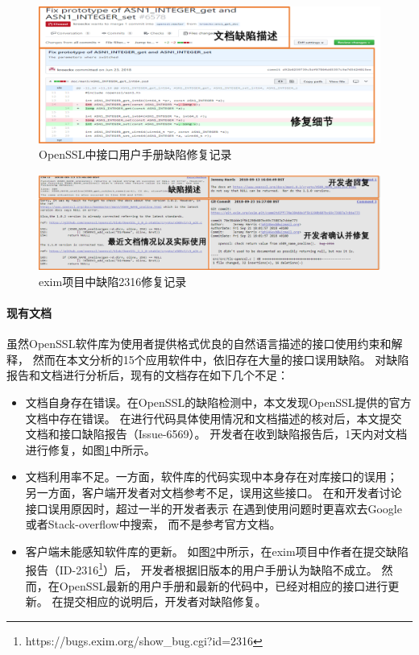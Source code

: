 \begin{figure}[b]
	\centering
	\includegraphics[width=\linewidth]{figures/cp4-doc-bug.png}
	\caption{
		OpenSSL中接口用户手册缺陷修复记录
	}
	\label{fig:4-4-doc-bug}
\end{figure}
\begin{figure}[t]
	\centering
	\includegraphics[width=\linewidth]{figures/cp4-exim-bug.png}
	\caption{
		exim项目中缺陷2316修复记录
	}
	\label{fig:4-4-exim-bug}
\end{figure}
\paragraph{现有文档}
虽然OpenSSL软件库为使用者提供格式优良的自然语言描述的接口使用约束和解释，
然而在本文分析的15个应用软件中，依旧存在大量的接口误用缺陷。
对缺陷报告和文档进行分析后，现有的文档存在如下几个不足：
\begin{itemize}
	\item 文档自身存在错误。在OpenSSL的缺陷检测中，本文发现OpenSSL提供的官方文档中存在错误。
	在进行代码具体使用情况和文档描述的核对后，本文提交文档和接口缺陷报告（Issue-6569）。
	开发者在收到缺陷报告后，1天内对文档进行修复，如图\ref{fig:4-4-doc-bug}中所示。
	\item 文档利用率不足。一方面，软件库的代码实现中本身存在对库接口的误用；
	另一方面，客户端开发者对文档参考不足，误用这些接口。
	在和开发者讨论接口误用原因时，超过一半的开发者表示
	在遇到使用问题时更喜欢去Google或者Stack-overflow中搜索，
	而不是参考官方文档。
	\item 客户端未能感知软件库的更新。
	如图\ref{fig:4-4-exim-bug}中所示，在exim项目中作者在提交缺陷报告（ID-2316\footnote{https://bugs.exim.org/show\_bug.cgi?id=2316}）后，
	开发者根据旧版本的用户手册认为缺陷不成立。
	然而，在OpenSSL最新的用户手册和最新的代码中，已经对相应的接口进行更新。
	在提交相应的说明后，开发者对缺陷修复。
\end{itemize}

